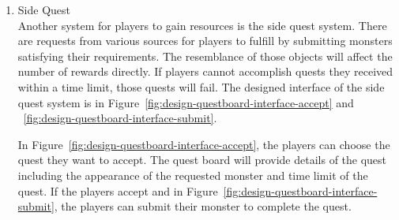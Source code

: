 \documentclass[12pt,oneside,openright,a4paper]{cpe-english-project}
\begin{document}
\begin{itemize}
\begin{itemize}
\begin{enumerate}
		\item Side Quest \\
		Another system for players to gain resources is the side quest system. There are requests from various sources for players to fulfill by submitting monsters satisfying their requirements. The resemblance of those objects will affect the number of rewards directly. If players cannot accomplish quests they received within a time limit, those quests will fail. The designed interface of the side quest system is in Figure~\ref{fig:design-questboard-interface-accept} and ~\ref{fig:design-questboard-interface-submit}. \\
		\begin{minipage}[c]{\textwidth}\centering
		\label{fig:design-questboard-interface-accept}
		\end{minipage}
		\begin{minipage}[c]{\textwidth}\centering
		\label{fig:design-questboard-interface-submit}
		\end{minipage}
		In Figure~\ref{fig:design-questboard-interface-accept}, the players can choose the quest they want to accept. The quest board will provide details of the quest including the appearance of the requested monster and time limit of the quest. If the players accept and in Figure~\ref{fig:design-questboard-interface-submit}, the players can submit their monster to complete the quest.
	

\end{enumerate}
\end{itemize}
\end{itemize}
\end{document}
